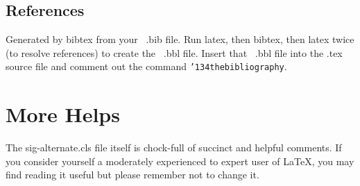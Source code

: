 \documentclass{sig-alternate}
\begin{document}
\subsection{References}
Generated by bibtex from your ~.bib file.  Run latex,
then bibtex, then latex twice (to resolve references)
to create the \cite{mur} ~.bbl file. \cite{roadalarm} Insert that ~.bbl file into
the .tex source file and comment out
the command \texttt{{\char'134}thebibliography}.
\section{More Helps}
The sig-alternate.cls file itself is chock-full of succinct
and helpful comments.  If you consider yourself a moderately
experienced to expert user of \LaTeX, you may find reading
it useful but please remember not to change it.
\end{document}
